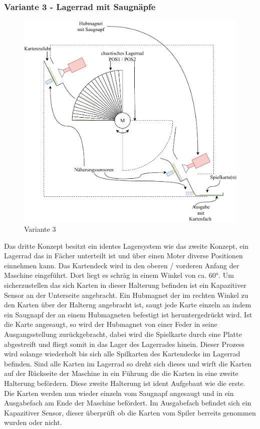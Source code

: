 \subsubsection{Variante 3 - Lagerrad mit Saugnäpfe}

\begin{figure}[H]
    \centering
    \includegraphics[scale=0.5,page=1]{fig/mech/Version3}
    \caption{Variante 3}
\end{figure}

Das dritte Konzept besitzt ein identes Lagersystem wie das zweite Konzept, ein Lagerrad das in Fächer unterteilt ist und über einen Moter diverse Positionen einnehmen kann.
Das Kartendeck wird in den oberen / vorderen Anfang der Maschine eingeführt. Dort liegt es schräg in einem Winkel von ca. 60°. Um sicherzustellen das sich Karten in dieser Halterung befinden
ist ein Kapazitiver Sensor an der Unterseite angebracht. Ein Hubmagnet der im rechten Winkel zu den Karten über der Halterng angebracht ist, saugt jede Karte einzeln an indem ein Saugnapf der an einem Hubmagneten
befestigt ist heruntergedrückt wird. Ist die Karte angesaugt, so wird der Hubmagnet von einer Feder in seine Ausgangsstellung zurückgebracht, dabei wird die Spielkarte durch eine Platte abgestreift und fliegt somit in das Lager des
Lagerrades hinein. Dieser Prozess wird solange wiederholt bis sich alle Spilkarten des Kartendecks im Lagerrad befinden. Sind alle Karten im Lagerrad so dreht sich dieses und wirft die Karten auf der Rückseite der Maschine in ein Führung
die die Karten in eine zweite Halterung befördern. Diese zweite Halterung ist ident Aufgebaut wie die erste. Die Karten werden nun wieder einzeln vom Saugnapf angesaugt und in ein Ausgabefach am Ende der Maschine befördert. Im Ausgabefach befindet sich
ein Kapazitiver Sensor, dieser überprüft ob die Karten vom Spiler berreits genommen wurden oder nicht.\\


